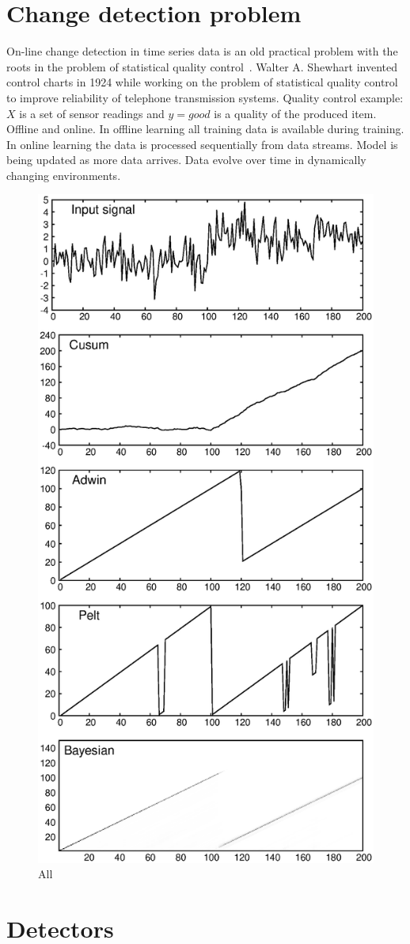 \documentclass[doctoral,utf8,lot,loar,lof,shortloft,index]{jydiss}
\begin{document}
\section{Change detection problem}

On-line change detection in time series data is an old practical problem with the roots in the problem of statistical quality control~\cite{basseville1993detection,NISTbook}.
Walter A. Shewhart invented control charts in 1924 while working on the problem of statistical quality control to improve reliability of telephone transmission systems. 
Quality control example: $X$ is a set of sensor readings and $y=good$ is a quality of the produced item. 
Offline and online. 
In offline learning all training data is available during training. 
In online learning the data is processed sequentially from data streams.
Model is being updated as more data arrives. 
Data evolve over time in dynamically changing environments.

\begin{figure}[!htb]
	\centering
	\includegraphics[height=0.9\textwidth]{images/detectors_output_stats}
	\caption{All}\label{fig:all_detectors_stats}
\end{figure}

\section{Detectors}
\end{document}
